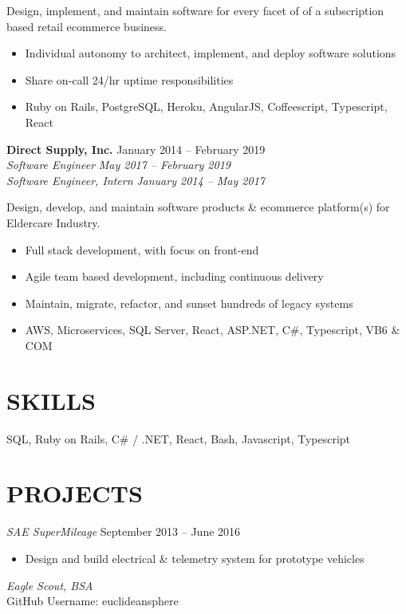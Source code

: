 \documentclass[line,margin]{res}
\begin{document}
\begin{resume}
Design, implement, and maintain software for every facet of of a subscription based retail ecommerce business.

\begin{itemize}
\item Individual autonomy to architect, implement, and deploy software solutions
\item Share on-call 24/hr uptime responsibilities
\item Ruby on Rails, PostgreSQL, Heroku, AngularJS, Coffeescript, Typescript, \\ React
\end{itemize}

\textbf{Direct Supply, Inc.} \hfill January 2014 -- February 2019 \\
{\sl Software Engineer} \hfill {\sl May 2017 -- February 2019} \\
{\sl Software Engineer, Intern} \hfill {\sl January 2014 -- May 2017}

Design, develop, and maintain software products \& ecommerce platform(s) for Eldercare Industry.

\begin{itemize}
\item Full stack development, with focus on front-end
\item Agile team based development, including continuous delivery
\item Maintain, migrate, refactor, and sunset hundreds of legacy systems
\item AWS, Microservices, SQL Server, React, ASP.NET, C\#, Typescript, VB6 \& COM
\end{itemize}

\section{SKILLS}
SQL, Ruby on Rails, C\# / .NET, React, Bash, Javascript, Typescript

\section{PROJECTS}

{\sl SAE SuperMileage} \hfill September 2013 -- June 2016
\begin{itemize}
\item Design and build electrical \& telemetry system for prototype vehicles
\end{itemize}

{\sl Eagle Scout, BSA} \\

GitHub Username: euclideansphere

\end{resume}
\end{document}
